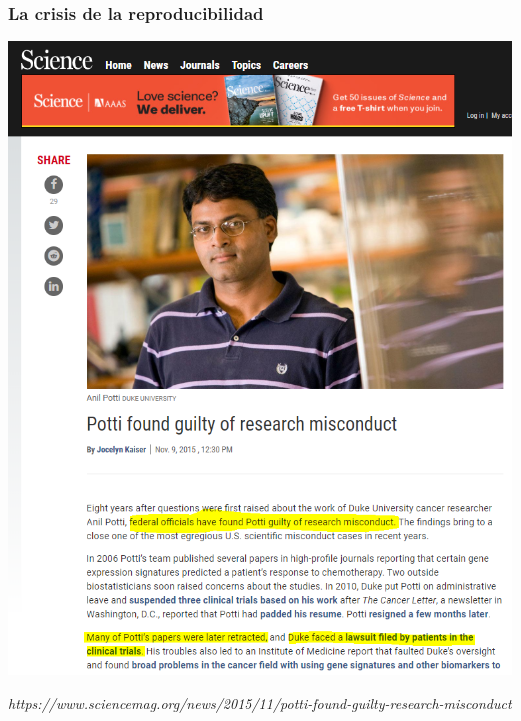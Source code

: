 \documentclass[9pt]{beamer}
\begin{document}
\begin{frame}
  \frametitle{La crisis de la reproducibilidad}
  \begin{center}
    \includegraphics[height=0.85\textheight]{images/potti_portada_2}
  \end{center}
    \hfill\begin{minipage}[h]{0.8\linewidth}
    {\tiny \textit{https://www.sciencemag.org/news/2015/11/potti-found-guilty-research-misconduct}}
  \end{minipage}
\end{frame}
\end{document}
